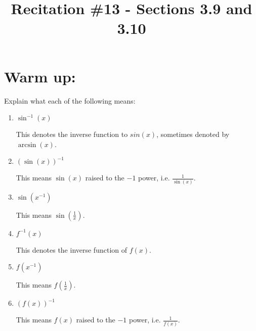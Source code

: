 \documentclass[handout,nooutcomes]{ximera}
\title{Recitation \#13 - Sections 3.9 and 3.10}
\begin{document}
\begin{abstract}		\end{abstract}
\maketitle

\section*{Warm up:} 
Explain what each of the following means:
	\begin{multicols}{2}
	\begin{enumerate}
	
	\item  $\sin^{-1}(x)$
		\begin{freeResponse}
		This denotes the inverse function to $sin(x)$, sometimes denoted by $\arcsin(x)$.  
		\end{freeResponse}	
		
	\item  $\left( \sin(x) \right)^{-1}$
		\begin{freeResponse}
		This means $\sin(x)$ raised to the $-1$ power, i.e. $\frac{1}{\sin(x)}$.  
		\end{freeResponse}	
		
	\item  $\sin \left(x^{-1} \right)$
		\begin{freeResponse}
		This means $\sin \left( \frac{1}{x} \right)$.
		\end{freeResponse}	
		
	\item  $f^{-1}(x)$
		\begin{freeResponse}
		This denotes the inverse function of $f(x)$.  
		\end{freeResponse}	
		
	\item  $f(x^{-1})$
		\begin{freeResponse}
		This means $f \left( \frac{1}{x} \right)$.
		\end{freeResponse}	
		
	\item  $\left( f(x) \right)^{-1}$
		\begin{freeResponse}
		This means $f(x)$ raised to the $-1$ power, i.e. $\frac{1}{f(x)}$.  
		\end{freeResponse}	
	
	
		
	\end{enumerate}
	\end{multicols}
		
\end{document}
